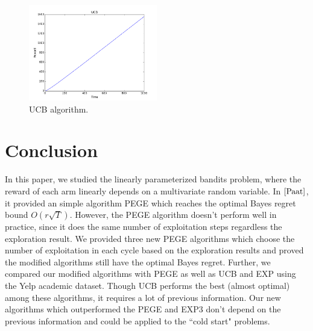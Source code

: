 \documentclass{article}
\theoremstyle{plain}
\theoremstyle{definition}
\begin{document}
\begin{figure}[htb]
{
\centering
\includegraphics[width=0.50\textwidth]{UCB1}
\caption{UCB algorithm. \label{fig: tah2}}
}
\end{figure}



\section{Conclusion}

In this paper, we studied the linearly parameterized bandits problem, where the reward of each arm linearly depends on a multivariate random variable. In $\cite{Paat}$, it provided an simple algorithm PEGE which reaches the optimal Bayes regret bound $O(r\sqrt{T})$. However, the PEGE algorithm doesn't perform well in practice, since it does the same number of exploitation steps regardless the exploration result. We provided three new PEGE algorithms which choose the number of exploitation in each cycle based on the exploration results and proved the modified algorithms still have the optimal Bayes regret. Further, we compared our modified algorithms with PEGE as well as UCB and EXP using the Yelp academic dataset. Though UCB performs the best (almost optimal) among these algorithms, it requires a lot of previous information. Our new algorithms which outperformed the PEGE and EXP3 don't depend on the previous information and could be applied to the ``cold start" problems.


\nocite{langley00}





%
%
%
\end{document}
